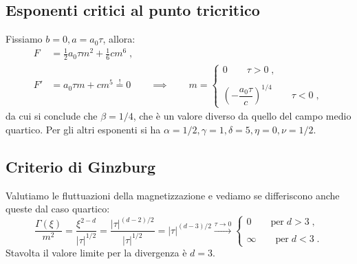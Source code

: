\documentclass[10pt,a4paper]{report}
\theoremstyle{definition}
\numberwithin{equation}{section}
\begin{document}
\subsection{Esponenti critici al punto tricritico}
Fissiamo $b=0,a=a_0\tau$, allora:
\begin{align*}
F &= \frac{1}{2}a_0\tau m^2+\frac{1}{6}cm^6\;, \\
F' &= a_0\tau m +cm^5\stackrel{!}{=}0 \qquad \implies \qquad m=\begin{cases}
0\qquad \tau>0\;, \\
\\
\left(-\dfrac{a_0\tau}{c}\right)^{1/4}\qquad \tau<0\;,
\end{cases}
\end{align*}
da cui si conclude che $\beta=1/4$, che è un valore diverso da quello del campo medio quartico. Per gli altri esponenti si ha $\alpha=1/2,\gamma=1,\delta=5,\eta=0,\nu=1/2$.
\subsection*{Criterio di Ginzburg}
Valutiamo le fluttuazioni della magnetizzazione e vediamo se differiscono anche queste dal caso quartico:
\begin{equation}
\frac{\Gamma(\xi)}{m^2}=\frac{\xi^{2-d}}{|\tau|^{1/2}}=\frac{|\tau|^{(d-2)/2}}{|\tau|^{1/2}}=|\tau|^{(d-3)/2}\stackrel{\tau\to 0}{\longrightarrow}\begin{cases}
0\qquad\mbox{per}\; d>3\;, \\
\\
\infty\qquad\mbox{per}\; d<3\;.
\end{cases}
\end{equation}
Stavolta il valore limite per la divergenza è $d=3$.
\end{document}
